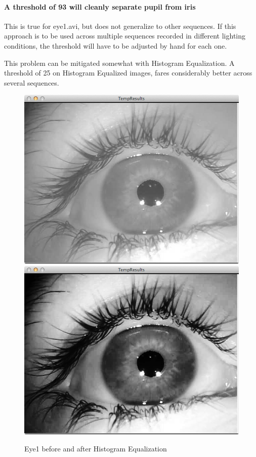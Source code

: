 \documentclass[a4paper,11pt]{article}
\begin{document}
\paragraph{A threshold of 93 will cleanly separate pupil from iris}
This is true for eye1.avi, but does not generalize to other sequences. If this approach is to be used across multiple sequences recorded in different lighting conditions, the threshold will have to be adjusted by hand for each one.

This problem can be mitigated somewhat with Histogram Equalization. A threshold of 25 on Histogram Equalized images, fares considerably better across several sequences.

\begin{figure}[H]
  \centering
  \includegraphics[scale=0.2]{eye1}
  \includegraphics[scale=0.2]{eye1_hist_eq}
  \caption{Eye1 before and after Histogram Equalization}
  \label{fig:eye1_hist_eq}
\end{figure}
\end{document}
